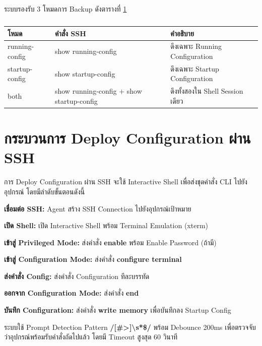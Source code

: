 \hspace*{1.3em}
ระบบรองรับ 3 โหมดการ Backup ดังตารางที่ \ref{tabD2:BackupModes}

\begin{table}[H]
\centering
\caption{}
\label{tabD2:BackupModes}
\fontSixTeen
\begin{tabularx}{\textwidth}{|l|l|X|}
\hline
\textbf{โหมด} & \textbf{คำสั่ง SSH} & \textbf{คำอธิบาย} \\
\hline
running-config & show running-config & ดึงเฉพาะ Running Configuration \\
\hline
startup-config & show startup-config & ดึงเฉพาะ Startup Configuration \\
\hline
both & show running-config + show startup-config & ดึงทั้งสองใน Shell Session เดียว \\
\hline
\end{tabularx}
\end{table}

\section{กระบวนการ Deploy Configuration ผ่าน SSH}
\hspace*{1.3em}
การ Deploy Configuration ผ่าน SSH จะใช้ Interactive Shell เพื่อส่งชุดคำสั่ง CLI ไปยังอุปกรณ์ โดยมีลำดับขั้นตอนดังนี้

\begin{mycustomenum2}
    \item \textbf{เชื่อมต่อ SSH:} Agent สร้าง SSH Connection ไปยังอุปกรณ์เป้าหมาย
    \item \textbf{เปิด Shell:} เปิด Interactive Shell พร้อม Terminal Emulation (xterm)
    \item \textbf{เข้าสู่ Privileged Mode:} ส่งคำสั่ง \textbf{enable} พร้อม Enable Password (ถ้ามี)
    \item \textbf{เข้าสู่ Configuration Mode:} ส่งคำสั่ง \textbf{configure terminal}
    \item \textbf{ส่งคำสั่ง Config:} ส่งคำสั่ง Configuration ทีละบรรทัด
    \item \textbf{ออกจาก Configuration Mode:} ส่งคำสั่ง \textbf{end}
    \item \textbf{บันทึก Configuration:} ส่งคำสั่ง \textbf{write memory} เพื่อบันทึกลง Startup Config
\end{mycustomenum2}

\hspace*{1.3em}
ระบบใช้ Prompt Detection Pattern \textbf{/[\#>]\textbackslash s*\$/} พร้อม Debounce 200ms เพื่อตรวจจับว่าอุปกรณ์พร้อมรับคำสั่งถัดไปแล้ว โดยมี Timeout สูงสุด 60 วินาที

